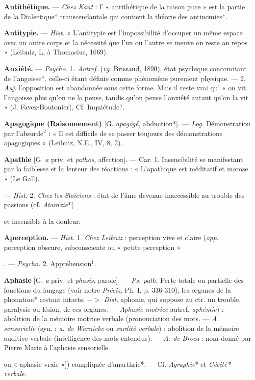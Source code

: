 \begin{itemize}[leftmargin=1cm, label=, itemsep=1pt]
{{{{\item {\bf Antithétique.} — {\it Chez Kant} : l’ « antithétique de la raison pure » est la
partie de la Dialectique* transcendantale qui contient la théorie des
antinomies*.

\item {\bf Antitypie.} — \textsf{\textit {Hist.}} « L’antitypie est
l'impossibilité d'occuper un même
espace avec un autre corps et la
nécessité que l’un ou l’autre se
meuve ou reste au repos » (Leibniz,
L, à Thomasius, 1669).

\item {\bf Anxiété.} — \textsf{\textit {Psycho.}} 1. {\it Autref}. ({\it vg}.
Brissaud, 1890), état psychique
concomitant de l’angoisse*, celle-ci
étant définie comme phénomène
purement physique. — 2. {\it Auj}.
l'opposition est abandonnée sous
cette forme. Mais il reste vrai qu’ « on
vit l’angoisse plus qu’on ne la pense,
tandis qu’on pense l’anxiété autant
qu'on la vit » (J. Favez-Boutonier),
Cf. Inquiétude?.

\item {\bf Apagogique (Raisonnement)} [G. {\it apagôgé}, abduction*].
— \textsf{\textit {Log.}} Démonstration par l'absurde$^2$ : « Il est
difficile de se passer toujours des
démonstrations apagogiques » (Leibniz, N.E., IV, 8, 2).

\item {\bf Apathie} [G. {\it a} priv. et {\it pathos}, affection].
— Car. 1. Insensibilité se
manifestant par la faiblesse et la
lenteur des réactions : « L’apathique
est méditatif et morose » (Le Gall).

— \textsf{\textit {Hist.}} 2. {\it Chez les Sloïciens} : état
de l'âme devenue inaccessible au
trouble des passions (cf. {\it Ataraxie}*)}
et insensible à la douleur.

\item {\bf Aperception.} — \textsf{\textit {Hist.}} 1. {\it Chez Leibniz} :
perception vive et claire ({\it opp}. perception obscure, subconsciente ou
« petite perception »}. — \textsf{\textit {Psycho.}}
2. Appréhension$^1$.

\item {\bf Aphasie} [G. {\it a} priv. et {\it phasis}, parole].
— \textsf{\textit {Ps. path.}} Perte totale ou partielle des fonctions du langage (voir
notre {\it Précis}, Ph. I, p. 336-310), les
organes de la phonation* restant
intacts. $->$ {\it Dist}. aphonie, qui suppose au ctr. un trouble, paralysie ou
lésion, de ces organes. — {\it Aphasie
motrice} {autref. {\it aphémie}) : abolition
de la mémoire motrice verbale (prononciation des mots}. — {\it A.
sensorielle} (syn. : {\it a. de Wernicke} ou {\it surdité verbale}) :
abolition de la mémoire
auditive verbale (intelligence des
mots entendus). — {\it A. de Broca} :
nom donné par Pierre Marie à
l'aphasie sensorielle {ou « aphasie
vraie »]) compliquée d’anarthrie*. —
Cf. {\it Agraphie}* et {\it Cécité* verbale}.

}}}
\end{itemize}
